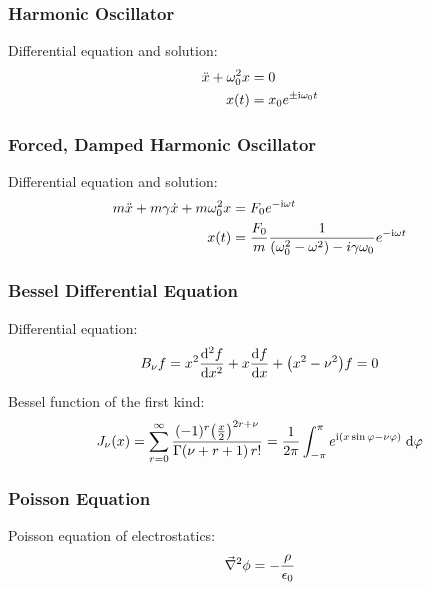 		\subsubsection{Harmonic Oscillator}
			\noindent
			Differential equation and solution:
			\begin{equation}
				\begin{aligned}
					\ddot{x}+\omega_0^2 x &= 0 \\
					x(t) &= x_0 e^{\pm \mathrm{i}\omega_0 t}
				\end{aligned}
			\end{equation}

		\subsubsection{Forced, Damped Harmonic Oscillator}
			\noindent
			Differential equation and solution:
			\begin{equation}
				\begin{aligned}
					m\ddot{x}+m\gamma\dot{x}+m\omega_0^2 x &= F_0 e^{-\mathrm{i}\omega t} \\
					x(t) &= \frac{F_0}{m} \frac{1}{\left(\omega_0^2-\omega^2\right)-i\gamma\omega_0} e^{-\mathrm{i}\omega t}
				\end{aligned}
			\end{equation}

		\subsubsection{Bessel Differential Equation}
			\noindent
			Differential equation:
			\begin{equation}
				B_\nu f = x^2\dv[2]{f}{x} + x\dv{f}{x}+\qty(x^2-\nu^2)f = 0
			\end{equation}

			\noindent
			Bessel function of the first kind:
			\begin{equation}
				J_\nu(x) = \sum_{r=0}^\infty \frac{(-1)^r\qty(\frac{x}{2})^{2r+\nu}}{\Gamma(\nu+r+1)\,r!} = \frac{1}{2\pi}\int_{-\pi}^{\pi} e^{\mathrm{i}(x\sin\varphi-\nu\varphi)}\;\dd\varphi
			\end{equation}

		\subsubsection{Poisson Equation}
			\noindent
			Poisson equation of electrostatics:
			\begin{equation}
				\vec{\nabla}^2\phi = -\frac{\rho}{\epsilon_0}
			\end{equation}

